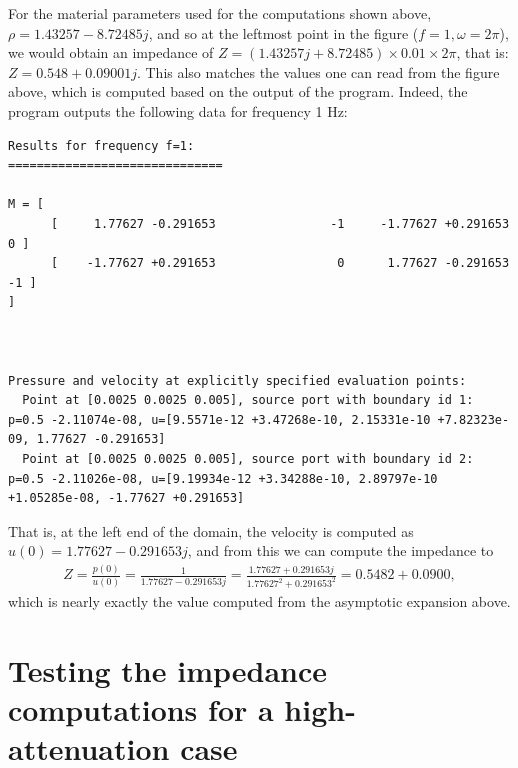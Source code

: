 \documentclass{article}
\begin{document}
For the material parameters used for the computations shown above, 
$\rho=1.43257-8.72485j$, and so at the leftmost point in the figure
($f=1,\omega=2\pi$), we would obtain an impedance of $Z=
(1.43257j+8.72485) \times 0.01 \times 2\pi$, that is: 
$Z=0.548+0.09001j$. This also matches the values one can read from the
figure above, which is computed based on the output of the
program. Indeed, the program outputs the following data for frequency
1 Hz:
\begin{verbatim}
Results for frequency f=1:
==============================

M = [
      [     1.77627 -0.291653                -1     -1.77627 +0.291653                 0 ]
      [    -1.77627 +0.291653                 0      1.77627 -0.291653                -1 ]
]



Pressure and velocity at explicitly specified evaluation points:
  Point at [0.0025 0.0025 0.005], source port with boundary id 1:  p=0.5 -2.11074e-08, u=[9.5571e-12 +3.47268e-10, 2.15331e-10 +7.82323e-09, 1.77627 -0.291653]
  Point at [0.0025 0.0025 0.005], source port with boundary id 2:  p=0.5 -2.11026e-08, u=[9.19934e-12 +3.34288e-10, 2.89797e-10 +1.05285e-08, -1.77627 +0.291653]
\end{verbatim}
That is, at the left end of the domain, the velocity is computed as
$u(0)=1.77627-0.291653j$, and from this we can compute the impedance
to
\begin{align*}
  Z = \frac{p(0)}{u(0)} =
  \frac{1}{1.77627-0.291653j}
  =
  \frac{1.77627+0.291653j}{1.77627^2+0.291653^2}
  = 
  0.5482+0.0900,
\end{align*}
which is nearly exactly the value computed from the asymptotic
expansion above.



\section{Testing the impedance computations for a high-attenuation case}
\end{document}
